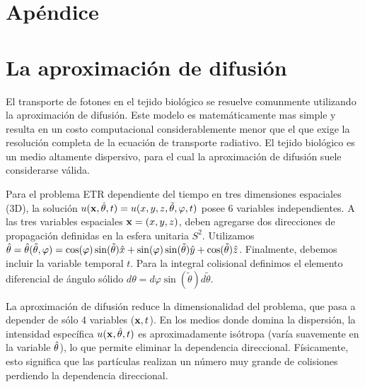 \pagestyle{fancy}
\chapter*{Apéndice}
\lhead{\thepage}
\vspace{0.01\textheight}

\clearpage \pagebreak \chapter{La aproximación de difusión}
\label{ap:ecdiff}

El transporte de fotones en el tejido biológico se resuelve 
comunmente utilizando la aproximación de difusión. 
Este modelo es matemáticamente mas simple y resulta en un 
costo computacional considerablemente menor que el que 
exige la resolución completa de la ecuación de transporte radiativo. 
El tejido biológico es un medio 
altamente dispersivo, para el cual la aproximación de 
difusión suele considerarse válida. 

Para el problema ETR dependiente del tiempo 
en tres dimensiones espaciales (3D), la solución $u(\mathbf{x},\hat{\theta},t)=u(x,y,z,\tilde{\theta},\varphi,t)$  
posee 6 variables independientes. A las tres variables espaciales $\mathbf{x}=(x,y,z)$, 
deben agregarse dos direcciones de propagación definidas en la esfera unitaria $S^2$. Utilizamos $\hat{\theta}=\hat{\theta}(\tilde{\theta},\varphi)=\cos(\varphi)\sin(\tilde{\theta})\hat x+\sin(\varphi)\sin(\tilde{\theta})\hat y+\cos(\tilde{\theta}) \hat z$. Finalmente, 
debemos incluir la variable temporal $t$. Para la integral colisional definimos el elemento diferencial de ángulo sólido  
$d\theta= d\varphi \sin(\tilde{\theta}) d\tilde{\theta}$. 

La aproximación 
de difusión reduce la dimensionalidad del problema, que pasa a depender de sólo 4 variables ($\mathbf{x},t$). 
En los medios donde domina la dispersión, la intensidad específica $u(\mathbf{x},\hat{\theta},t)$ es aproximadamente 
isótropa (varía suavemente en la variable $\hat{\theta}$), 
lo que permite eliminar la dependencia direccional. 
Físicamente, esto significa que las partículas realizan 
un número muy grande de colisiones perdiendo la dependencia 
direccional. 

